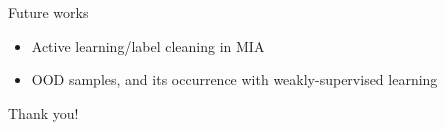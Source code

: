 \documentclass[handout]{beamer}
\begin{document}
\begin{frame}{Future works}
    \begin{itemize}
        \item Active learning/label cleaning in MIA
        \item OOD samples, and its occurrence with weakly-supervised learning
    \end{itemize}
\end{frame}

\begin{frame}
    \begin{center}
        Thank you!
    \end{center}
\end{frame}
\end{document}
